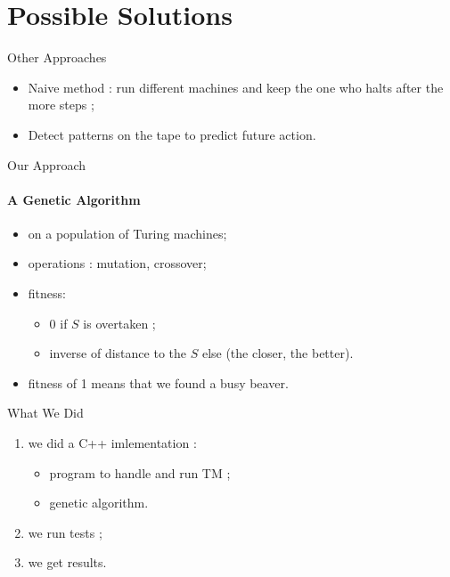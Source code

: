 \documentclass{beamer}
\begin{document}
\section{Possible Solutions}

\begin{frame}{Other Approaches}

  \begin{itemize}
  \item Naive method : run different machines and keep the one who halts after the more steps ; %
  \item Detect patterns on the tape to predict future action.
  \end{itemize}

\end{frame}

\begin{frame}{Our Approach}
  \framesubtitle{A Genetic Algorithm}

  \begin{itemize}
  \item on a population of Turing machines;
  \item operations : mutation, crossover;
  \item fitness:
    \begin{itemize}
    \item 0 if $S$ is overtaken ;
    \item inverse of distance to the $S$ else (the closer, the better).
    \end{itemize}
  \item fitness of 1 means that we found a busy beaver.
  \end{itemize}

\end{frame}

\begin{frame}{What We Did}

  \begin{enumerate}
  \item we did a C++ imlementation :
    \begin{itemize}
    \item program to handle and run TM ;
    \item genetic algorithm.
    \end{itemize}
  \item we run tests ;
  \item we get results.
  \end{enumerate}
\end{frame}
\end{document}
